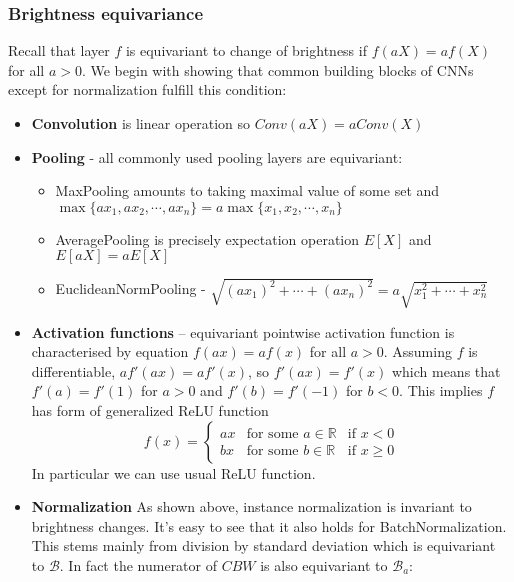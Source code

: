 \subsubsection{Brightness equivariance}
Recall that layer $f$ is equivariant to
change of brightness if $ f(aX) = af(X)$ for all $a>0$.
We begin with showing that common building blocks of CNNs except for
normalization fulfill this condition:
\begin{itemize}
    \item \textbf{Convolution} is linear operation so $\mathit{Conv}(aX) =
        a\mathit{Conv}(X)$
    \item \textbf{Pooling} - all commonly used pooling layers are equivariant:
        \begin{itemize}
            \item MaxPooling amounts to taking maximal value of some set and\\
                $\max\{ax_1,ax_2,\cdots,ax_n\}=a\max\{x_1,x_2,\cdots,x_n\}$
            \item AveragePooling is precisely expectation operation $E[X]$ and
                    $E[aX] = aE[X]$
            \item EuclideanNormPooling -
                $\sqrt{(ax_1)^2+\cdots+(ax_n)^2} = a\sqrt{x_1^2+\cdots+x_n^2}$
        \end{itemize}
    \item \textbf{Activation functions} -- equivariant pointwise activation
        function is characterised by equation $f(ax) = af(x)$ for all $a>0$.
        Assuming $f$ is differentiable, $af'(ax) = af'(x)$, so $f'(ax)=f'(x)$ which
        means that $f'(a)=f'(1)$ for $a>0$ and $f'(b)=f'(-1)$ for $b<0$.
        This implies $f$ has form of generalized ReLU function
        $$f(x)=\left\{
            \begin{array}{lll}
                ax & \mbox{for some } a \in \mathbb{R} & \mbox{if } x<0 \\
                bx & \mbox{for some } b \in \mathbb{R} & \mbox{if } x \geq 0
            \end{array}\right.$$
        In particular we can use usual ReLU function.
    \item \textbf{Normalization} As shown above, instance normalization is
        invariant to brightness changes. It's easy to see that it also holds
        for BatchNormalization. This stems mainly from division by
        standard deviation which is equivariant to $\mathcal{B}$. In fact
        the numerator of $\mathit{CBW}$ is also equivariant to $\mathcal{B}_a$:

\end{itemize}
